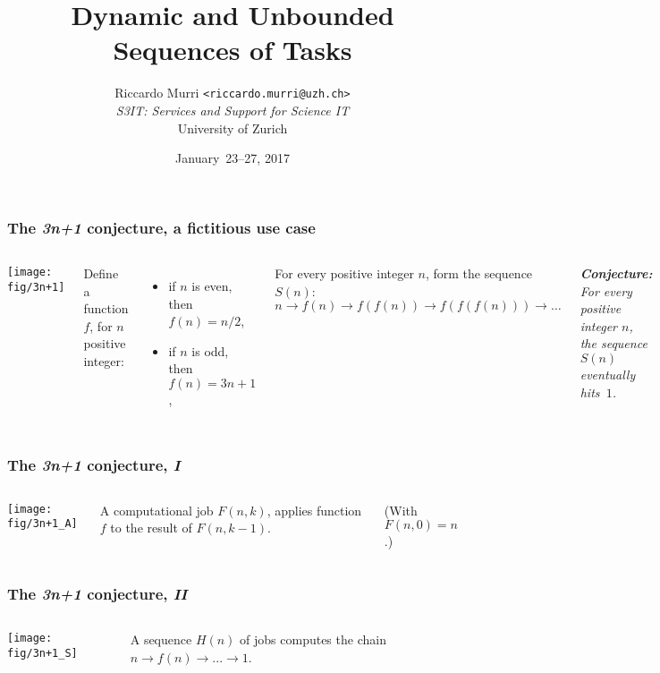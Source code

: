 \documentclass[english,serif,mathserif,xcolor=pdftex,dvipsnames,table]{beamer}
\title[Dynamic Sequences]{%
  Dynamic and Unbounded Sequences of Tasks
}
\author[R. Murri, S3IT UZH]{%
  Riccardo Murri \texttt{<riccardo.murri@uzh.ch>}
  \\[1ex]
  \emph{S3IT: Services and Support for Science IT}
  \\[1ex]
  University of Zurich
}
\date{January~23--27, 2017}
\begin{document}
\maketitle


\begin{frame}
  \frametitle{The \emph{3n+1} conjecture, a fictitious use case}
  \label{sec:7a}

  \+
  \begin{columns}[c]
    \texttt{[image: fig/3n+1]}

    \small
    Define a function $f$, for $n$ positive integer:
    \begin{itemize}
    \item if $n$ is even, then $f(n) = n / 2$,
    \item if $n$ is odd, then $f(n) = 3n+1$,
    \end{itemize}

    \+
    For every positive integer $n$, form the sequence $S(n)$:
    $n \to f(n) \to f(f(n)) \to f(f(f(n))) \to \ldots$

    \+
    \itshape
    \textbf{Conjecture:} For every positive integer $n$, the sequence $S(n)$
    eventually hits~$1$.
  \end{columns}
\end{frame}

\begin{frame}
  \frametitle{The \emph{3n+1} conjecture, \emph{I}}
  \label{sec:7}

  \+
  \begin{columns}[c]
    \texttt{[image: fig/3n+1\_A]}

    A computational job $F(n,k)$, applies
    function $f$ to the result of $F(n,k-1)$.

    \+
    (With $F(n,0) = n$.)
  \end{columns}
\end{frame}

\begin{frame}
  \frametitle{The \emph{3n+1} conjecture, \emph{II}}
  \label{sec:7b}

  \+
  \begin{columns}[c]
    \texttt{[image: fig/3n+1\_S]}

    A sequence $H(n)$ of jobs computes the
    chain $n \to f(n) \to ... \to 1$.
  \end{columns}
\end{frame}
\end{document}
